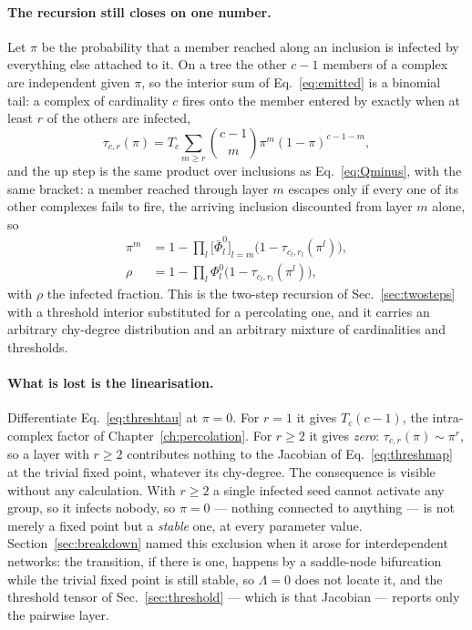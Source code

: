 \paragraph{The recursion still closes on one number.} Let $\pi$ be the
probability that a member reached along an inclusion is infected by everything
else attached to it. On a tree the other $c-1$ members of a complex are
independent given $\pi$, so the interior sum of Eq.~\eqref{eq:emitted} is a
binomial tail: a complex of cardinality $c$ fires onto the member entered by
exactly when at least $r$ of the others are infected,
\begin{equation}
  \tau_{c,r}(\pi)=T_{c}\sum_{m\ge r}\binom{c-1}{m}\pi^{m}(1-\pi)^{c-1-m},
  \label{eq:threshtau}
\end{equation}
and the up step is the same product over inclusions as
Eq.~\eqref{eq:Qminus}, with the same bracket: a member reached through layer $m$
escapes only if every one of its other complexes fails to fire, the arriving
inclusion discounted from layer $m$ alone, so
\begin{equation}
  \begin{aligned}
    \pi^{m}&=1-\prod_{l}\bigl[\bar\Phi^{0}_{l}\bigr]_{l=m}
             \bigl(1-\tau_{c_{l},r_{l}}(\pi^{l})\bigr),\\
    \rho&=1-\prod_{l}\Phi^{0}_{l}
          \bigl(1-\tau_{c_{l},r_{l}}(\pi^{l})\bigr),
  \end{aligned}
  \label{eq:threshmap}
\end{equation}
with $\rho$ the infected fraction. This is the two-step recursion of
Sec.~\ref{sec:twosteps} with a threshold interior substituted for a
percolating one, and it carries an arbitrary chy-degree distribution and an
arbitrary mixture of cardinalities and thresholds.

\paragraph{What is lost is the linearisation.} Differentiate
Eq.~\eqref{eq:threshtau} at $\pi=0$. For $r=1$ it gives $T_{c}(c-1)$, the
intra-complex factor of Chapter~\ref{ch:percolation}. For $r\ge2$ it gives
\emph{zero}: $\tau_{c,r}(\pi)\sim\pi^{r}$, so a layer with $r\ge2$ contributes
nothing to the Jacobian of Eq.~\eqref{eq:threshmap} at the trivial fixed point,
whatever its chy-degree. The consequence is visible without any calculation.
With $r\ge2$ a single infected seed cannot activate any group, so it infects
nobody, so $\pi=0$ --- nothing connected to anything --- is not merely a fixed
point but a \emph{stable} one, at every parameter value.
Section~\ref{sec:breakdown} named this exclusion when it arose for
interdependent networks: the transition, if there is one, happens by a
saddle-node bifurcation while the trivial fixed point is still stable, so
$\Lambda=0$ does not locate it, and the threshold tensor of
Sec.~\ref{sec:threshold} --- which is that Jacobian --- reports only the
pairwise layer.

